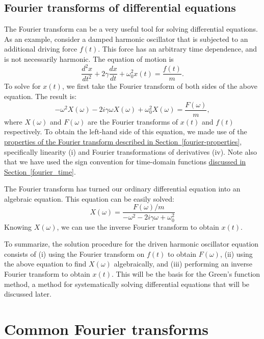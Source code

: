 \documentclass[10pt,a4paper]{article}
\begin{document}
\subsection{Fourier transforms of differential equations}
\label{fourier-transforms-of-differential-equations}

The Fourier transform can be a very useful tool for solving
differential equations. As an example, consider a damped harmonic
oscillator that is subjected to an additional driving force $f(t)$.
This force has an arbitrary time dependence, and is not necessarily
harmonic. The equation of motion is
\begin{equation}
  \frac{d^2 x}{dt^2} + 2\gamma \frac{dx}{dt} + \omega_0^2 x(t) = \frac{f(t)}{m}.
\end{equation}
To solve for $x(t)$, we first take the Fourier transform of both sides
of the above equation. The result is:
\begin{equation}
  - \omega^2 X(\omega) - 2 i\gamma \omega X(\omega) + \omega_0^2 X(\omega) = \frac{F(\omega)}{m},
\end{equation}
where $X(\omega)$ and $F(\omega)$ are the Fourier transforms of $x(t)$
and $f(t)$ respectively. To obtain the left-hand side of this
equation, we made use of the \hyperref[fourier-properties]{properties
  of the Fourier transform described in
  Section~\ref{fourier-properties}}, specifically linearity (i) and
Fourier transformations of derivatives (iv). Note also that we have
used the sign convention for time-domain functions
\hyperref[fourier_time]{discussed in Section~\ref{fourier_time}}.

The Fourier transform has turned our ordinary differential equation
into an algebraic equation. This equation can be easily solved:
\begin{equation}
  X(\omega) = \frac{F(\omega)/m}{- \omega^2 - 2 i\gamma \omega + \omega_0^2}
\end{equation}
Knowing $X(\omega)$, we can use the inverse Fourier transform to
obtain $x(t)$.

To summarize, the solution procedure for the driven harmonic
oscillator equation consists of (i) using the Fourier transform on
$f(t)$ to obtain $F(\omega)$, (ii) using the above equation to find
$X(\omega)$ algebraically, and (iii) performing an inverse Fourier
transform to obtain $x(t)$. This will be the basis for the Green's
function method, a method for systematically solving differential
equations that will be discussed later.

\section{Common Fourier transforms}
\label{common-fourier-transforms}
\end{document}
